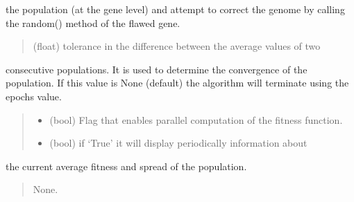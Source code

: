 \documentclass[letterpaper,10pt,english]{sphinxmanual}
\begin{document}
\begin{fulllineitems}
\begin{fulllineitems}
\begin{quote}
\begin{description}
\end{description}\end{quote}

\sphinxAtStartPar
the population (at the gene level) and attempt to correct the genome by calling
the random() method of the flawed gene.
\begin{quote}\begin{description}
\sphinxAtStartPar
{} \textendash{} (float) tolerance in the difference between the average values of two

\end{description}\end{quote}

\sphinxAtStartPar
consecutive populations. It is used to determine the convergence of the population.
If this value is None (default) the algorithm will terminate using the epochs value.
\begin{quote}\begin{description}
\begin{itemize}
\item {} 
\sphinxAtStartPar
{} \textendash{} (bool) Flag that enables parallel computation of the fitness function.

\item {} 
\sphinxAtStartPar
{} \textendash{} (bool) if ‘True’ it will display periodically information about

\end{itemize}

\end{description}\end{quote}

\sphinxAtStartPar
the current average fitness and spread of the population.
\begin{quote}\begin{description}
\sphinxAtStartPar
None.

\end{description}\end{quote}

\end{fulllineitems}



\end{fulllineitems}
\end{document}
